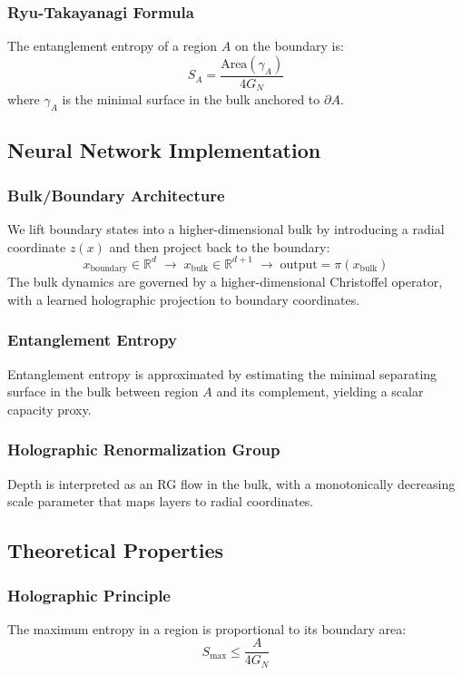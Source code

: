 \documentclass{article}
\numberwithin{equation}{section}
\begin{document}
\subsubsection{Ryu-Takayanagi Formula}
The entanglement entropy of a region $A$ on the boundary is:
\[
S_A = \frac{\mathrm{Area}(\gamma_A)}{4 G_N}
\]
where $\gamma_A$ is the minimal surface in the bulk anchored to $\partial A$.

\subsection{Neural Network Implementation}
\subsubsection{Bulk/Boundary Architecture}
We lift boundary states into a higher-dimensional bulk by introducing a radial coordinate $z(x)$ and then project back to the boundary:
\[
x_{\text{boundary}} \in \mathbb{R}^d \;\rightarrow\; x_{\text{bulk}} \in \mathbb{R}^{d+1} \;\rightarrow\; \text{output} = \pi(x_{\text{bulk}})
\]
The bulk dynamics are governed by a higher-dimensional Christoffel operator, with a learned holographic projection to boundary coordinates.

\subsubsection{Entanglement Entropy}
Entanglement entropy is approximated by estimating the minimal separating surface in the bulk between region $A$ and its complement, yielding a scalar capacity proxy.

\subsubsection{Holographic Renormalization Group}
Depth is interpreted as an RG flow in the bulk, with a monotonically decreasing scale parameter that maps layers to radial coordinates.

\subsection{Theoretical Properties}
\subsubsection{Holographic Principle}
The maximum entropy in a region is proportional to its boundary area:
\[
S_{\max} \le \frac{A}{4 G_N}
\]
\end{document}
